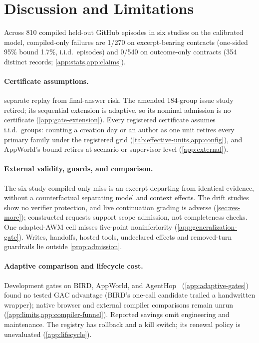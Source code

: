 \section{Discussion and Limitations}
\label{sec:discussion}

Across 810 compiled held-out GitHub episodes in six studies on the calibrated
model, compiled-only failures are 1/270 on excerpt-bearing contracts
(one-sided 95\% bound 1.7\%, i.i.d.\ episodes) and 0/540 on outcome-only contracts (354 distinct
records; \cref{app:stats,app:claims}).

\paragraph{Certificate assumptions.} 
separate replay from final-answer risk. The amended 184-group issue study
retired; its sequential extension is adaptive, so its nominal admission is no
certificate (\cref{app:gate-extension}). Every registered
certificate assumes i.i.d.\ groups: counting a creation day or an author as one
unit retires every primary family under the registered grid
(\cref{tab:effective-units,app:config}), and AppWorld's bound retires at scenario
or supervisor level (\cref{app:external}).

\paragraph{External validity, guards, and comparison.}
The
six-study compiled-only miss is an excerpt departing from identical evidence,
without a counterfactual separating model and context effects. The drift studies
show no verifier protection, and live continuation grading is adverse
(\cref{sec:res-more}); constructed requests support scope
admission, not completeness checks. One adapted-AWM cell misses
five-point noninferiority (\cref{app:generalization-gate}). Writes,
handoffs, hosted tools, undeclared effects and removed-turn guardrails lie
outside \cref{prop:admission}.

\paragraph{Adaptive comparison and lifecycle cost.}
Development gates on BIRD, AppWorld, and AgentHop~\citep{park2026agenthop}
(\cref{app:adaptive-gates}) found no tested GAC advantage (BIRD's one-call
candidate trailed a handwritten wrapper); native browser and external compiler
comparisons remain unrun (\cref{app:limits,app:compiler-funnel}).
Reported savings omit engineering and maintenance. The registry has rollback and a kill switch; its renewal policy is
unevaluated (\cref{app:lifecycle}).
